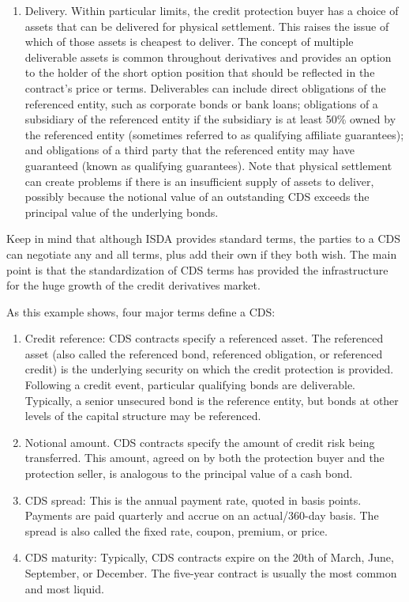 \documentclass[11pt]{article}
\begin{document}
\begin{enumerate}
  \item Delivery. Within particular limits, the credit protection buyer has a choice of assets that can be delivered for physical settlement. This raises the issue of which of those assets is cheapest to deliver. The concept of multiple deliverable assets is common throughout derivatives and provides an option to the holder of the short option position that should be reflected in the contract's price or terms. Deliverables can include direct obligations of the referenced entity, such as corporate bonds or bank loans; obligations of a subsidiary of the referenced entity if the subsidiary is at least 50\% owned by the referenced entity (sometimes referred to as qualifying affiliate guarantees); and obligations of a third party that the referenced entity may have guaranteed (known as qualifying guarantees). Note that physical settlement can create problems if there is an insufficient supply of assets to deliver, possibly because the notional value of an outstanding CDS exceeds the principal value of the underlying bonds.

\end{enumerate}

Keep in mind that although ISDA provides standard terms, the parties to a CDS can negotiate any and all terms, plus add their own if they both wish. The main point is that the standardization of CDS terms has provided the infrastructure for the huge growth of the credit derivatives market.

As this example shows, four major terms define a CDS:

\begin{enumerate}
  \item Credit reference: CDS contracts specify a referenced asset. The referenced asset (also called the referenced bond, referenced obligation, or referenced credit) is the underlying security on which the credit protection is provided. Following a credit event, particular qualifying bonds are deliverable. Typically, a senior unsecured bond is the reference entity, but bonds at other levels of the capital structure may be referenced.

  \item Notional amount. CDS contracts specify the amount of credit risk being transferred. This amount, agreed on by both the protection buyer and the protection seller, is analogous to the principal value of a cash bond.

  \item CDS spread: This is the annual payment rate, quoted in basis points. Payments are paid quarterly and accrue on an actual/360-day basis. The spread is also called the fixed rate, coupon, premium, or price.

  \item CDS maturity: Typically, CDS contracts expire on the 20th of March, June, September, or December. The five-year contract is usually the most common and most liquid.

\end{enumerate}
\end{document}
